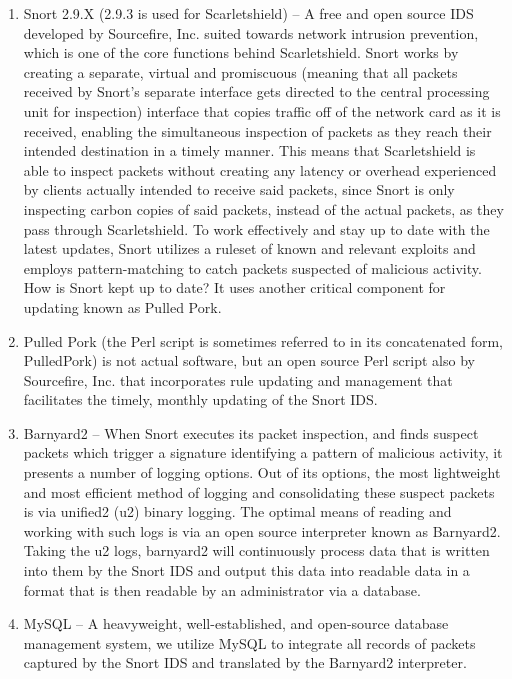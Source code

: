 \documentclass[12pt,letterpaper,titlepage]{report}
\begin{document}
{\begin{enumerate}
\item Snort 2.9.X (2.9.3 is used for Scarletshield) -- A free and open source IDS
developed by Sourcefire, Inc. suited towards network intrusion prevention,
which is one of the core functions behind Scarletshield.  Snort works by creating a
separate, virtual and promiscuous (meaning that all packets received by
Snort’s separate interface gets directed to the central processing unit for
inspection) interface that copies traffic off of the network card as it is
received, enabling the simultaneous inspection of packets as they reach
their intended destination in a timely manner.  This means that
Scarletshield is able to inspect packets without creating any latency or
overhead experienced by clients actually intended to receive said packets,
since Snort is only inspecting carbon copies of said packets, instead of
the actual packets, as they pass through Scarletshield. To work effectively
and stay up to date with the latest updates, Snort utilizes a ruleset of
known and relevant exploits and employs pattern-matching to catch packets
suspected of malicious activity.  How is Snort kept up to date?  It uses
another critical component for updating known as Pulled Pork.
    
\item Pulled Pork (the Perl script is sometimes referred to in its concatenated
form, PulledPork) is not actual software, but an open source Perl script also by
Sourcefire, Inc. that incorporates rule updating and management that facilitates
the timely, monthly updating of the Snort IDS.
    
\item  Barnyard2 -- When Snort executes its packet inspection, and finds suspect
packets which  trigger a signature identifying a pattern of malicious activity,
it presents a number of logging options.  Out of its options, the most
lightweight and most efficient method of logging and consolidating these suspect
packets is via unified2 (u2) binary logging.  The optimal means of reading and
working with such logs is via an open source interpreter known as Barnyard2.
Taking the u2 logs, barnyard2 will continuously process data that is written
into them by the Snort IDS and output this data into readable data in a format
that is then readable by an administrator via a database.
   
\item MySQL -- A heavyweight, well-established, and open-source database management
system, we utilize MySQL to integrate all records of packets captured by the
Snort IDS and translated by the Barnyard2 interpreter.


\end{enumerate}}
\end{document}
